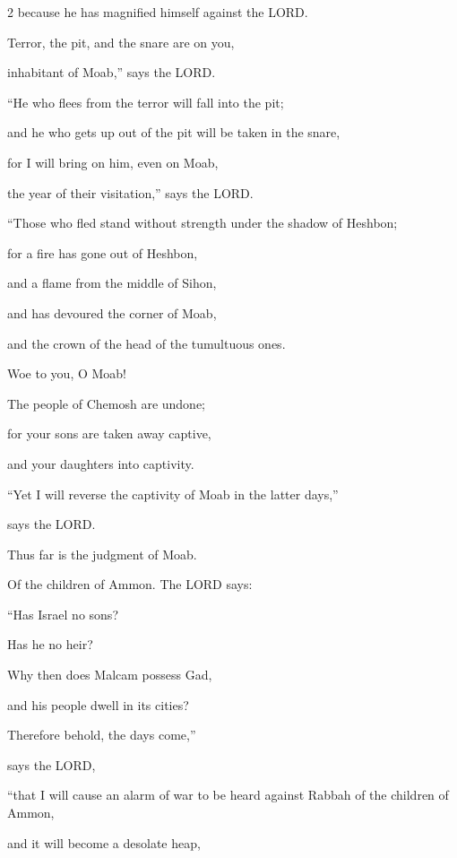 \begin{multicols}{2}
because he has magnified himself against the LORD.


\myverse{}Terror, the pit, and the snare are on you,

inhabitant of Moab,” says the LORD.


\myverse{}“He who flees from the terror will fall into the pit;

and he who gets up out of the pit will be taken in the snare,

for I will bring on him, even on Moab,

the year of their visitation,” says the LORD.

\vspace{\baselineskip}


\myverse{}“Those who fled stand without strength under the shadow of
Heshbon;

for a fire has gone out of Heshbon,

and a flame from the middle of Sihon,

and has devoured the corner of Moab,

and the crown of the head of the tumultuous ones.


\myverse{}Woe to you, O Moab!

The people of Chemosh are undone;

for your sons are taken away captive,

and your daughters into captivity.

\vspace{\baselineskip}


\myverse{}“Yet I will reverse the captivity of Moab in the latter days,”

says the LORD.

Thus far is the judgment of Moab.


\mychapter{} \myverse*{}Of the children of Ammon. The LORD says:

\quad\quad “Has Israel no sons?

Has he no heir?

Why then does Malcam possess Gad,

and his people dwell in its cities?


\myverse{}Therefore behold, the days come,”

says the LORD,

“that I will cause an alarm of war to be heard against Rabbah of the children of Ammon,

and it will become a desolate heap,


\end{multicols}
